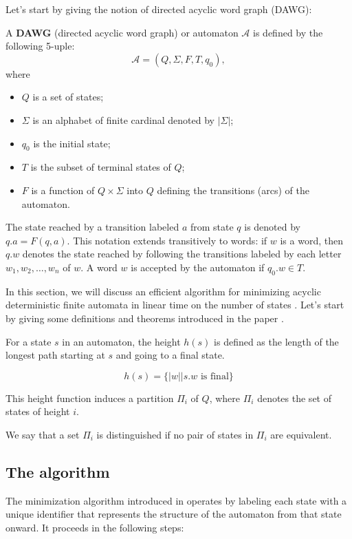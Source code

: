 Let's start by giving the notion of directed acyclic word graph (DAWG):
\begin{definition}[DAWG]
    A \textbf{DAWG} (directed acyclic word graph) or automaton $\mathcal{A}$ is defined by the following 5-uple:
    \[
    \mathcal{A} = (Q, \Sigma, F, T, q_0),
    \]
    where
    \begin{itemize}
        \item $Q$ is a set of states;
        \item $\Sigma$ is an alphabet of finite cardinal denoted by $|\Sigma|$;
        \item $q_0$ is the initial state;
        \item $T$ is the subset of terminal states of $Q$;
        \item $F$ is a function of $Q \times \Sigma$ into $Q$ defining the transitions (arcs) of the automaton.
    \end{itemize}
\end{definition}

The state reached by a transition labeled $a$ from state $q$ is denoted by $q.a = F(q,a)$. This notation extends transitively to words: if $w$ is a word, then $q.w$ denotes the state reached by following the transitions labeled by each letter $w_1, w_2, \ldots, w_n$ of $w$. A word $w$ is accepted by the automaton if $q_0.w \in T$.

In this section, we will discuss an efficient algorithm for minimizing acyclic deterministic finite automata in linear time on the number of states \cite{revuz1992minimisation}. Let's start by giving some definitions and theorems introduced in the paper \cite{revuz1992minimisation}.

\begin{definition}
    For a state $s$ in an automaton, the height $h(s)$ is defined as the length of the longest path starting at $s$ and going to a final state. 

    $$h(s) = \{|w||s.w \text{ is final}\}$$
\end{definition}

This height function induces a partition $\Pi_i$ of $Q$, where $\Pi_i$ denotes the set of states of height $i$.

\begin{definition}
    We say that a set $\Pi_i$ is distinguished if no pair of states in $\Pi_i$ are equivalent.
\end{definition}

\subsection{The algorithm}
The minimization algorithm introduced in \cite{revuz1992minimisation} operates by labeling each state with a unique identifier that represents the structure of the automaton from that state onward. It proceeds in the following steps:

